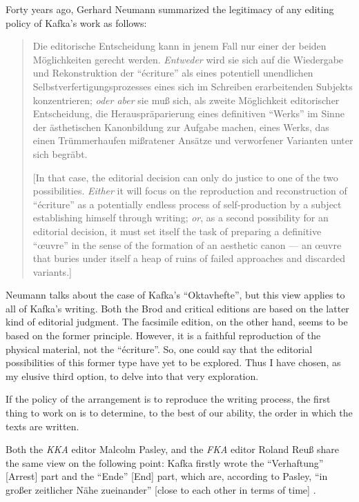 \documentclass{article}
\begin{document}
Forty years ago, Gerhard Neumann summarized the legitimacy of any
editing policy of Kafka's work as follows:

\begin{quote}
Die editorische Entscheidung kann in jenem Fall nur einer der beiden
Möglichkeiten gerecht werden. \emph{Entweder} wird sie sich auf die
Wiedergabe und Rekonstruktion der ``écriture'' als eines potentiell
unendlichen Selbstverfertigungsprozesses eines sich im Schreiben
erarbeitenden Subjekts konzentrieren; \emph{oder aber} sie muß sich, als
zweite Möglichkeit editorischer Entscheidung, die Herauspräparierung
eines definitiven ``Werks'' im Sinne der ästhetischen Kanonbildung zur
Aufgabe machen, eines Werks, das einen Trümmerhaufen mißratener Ansätze
und verworfener Varianten unter sich begräbt. 

\begin{flushright}
    \parencite[161; emphasis in original]{neumann_werk_1981}
\end{flushright}

{[}In that case, the editorial decision can only do justice to one of
the two possibilities. \emph{Either} it will focus on the reproduction
and reconstruction of ``écriture'' as a potentially endless process of
self-production by a subject establishing himself through writing;
\emph{or}, as a second possibility for an editorial decision, it must
set itself the task of preparing a definitive ``œuvre'' in the sense of
the formation of an aesthetic canon –– an œuvre that buries under itself
a heap of ruins of failed approaches and discarded variants.{]}
\end{quote}

Neumann talks about the case of Kafka's ``Oktavhefte'', but this view
applies to all of Kafka's writing. Both the Brod and critical editions
are based on the latter kind of editorial judgment. The facsimile edition, on the other hand, seems to be based on the former principle.
However, it is a faithful reproduction of the physical material, not the
``écriture''. So, one could say that the editorial possibilities of this
former type have yet to be explored. Thus I have chosen, as my elusive
third option, to delve into that very exploration.

If the policy of the arrangement is to reproduce the writing process,
the first thing to work on is to determine, to the best of our ability,
the order in which the texts are written.

Both the \emph{KKA} editor Malcolm Pasley, and the \emph{FKA} editor
Roland Reuß share the same view on the following point: Kafka firstly
wrote the ``Verhaftung'' {[}Arrest{]} part and the ``Ende''
{[}End{]} part, which are, according to Pasley, ``in großer zeitlicher Nähe
zueinander'' {[}close to each other in terms of time{]} \citep[111]{kafka_zur_1990}.
\end{document}
